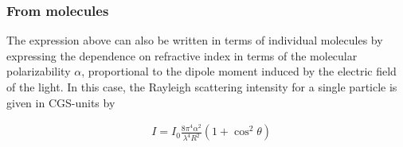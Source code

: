 \documentclass[main.tex]{subfiles}
\begin{document}
\subsubsection{From molecules}

The expression above can also be written in terms of individual molecules by expressing the dependence on refractive index in terms of the molecular polarizability $\alpha$, proportional to the dipole moment induced by the electric field of the light. In this case, the Rayleigh scattering intensity for a single particle is given in CGS-units by

\begin{align*}
&I=I_0\frac{8\pi^4\alpha^2}{\lambda^4R^2}(1+\cos^2{\theta})
\end{align*}
\end{document}
